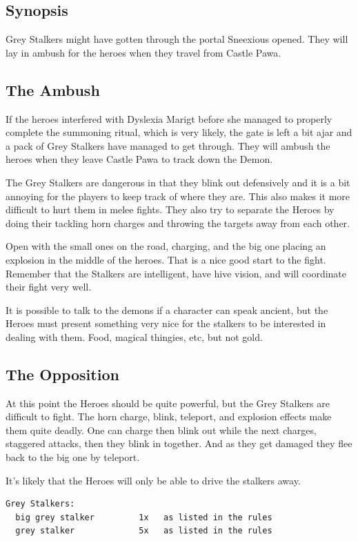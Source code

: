 \subsection*{Synopsis}
Grey Stalkers might have gotten through the portal Sneexious opened. They will lay in ambush for the heroes when they travel from Castle Pawa.


\subsection*{The Ambush}
If the heroes interfered with Dyslexia Marigt before she managed to properly complete the summoning ritual, which is very likely, the gate is left a bit ajar and a pack of Grey Stalkers have managed to get through. They will ambush the heroes when they leave Castle Pawa to track down the Demon.

The Grey Stalkers are dangerous in that they blink out defensively and it is a bit annoying for the players to keep track of where they are. This also makes it more difficult to hurt them in melee fights. They also try to separate the Heroes by doing their tackling horn charges and throwing the targets away from each other.

Open with the small ones on the road, charging, and the big one placing an explosion in the middle of the heroes. That is a nice good start to the fight. Remember that the Stalkers are intelligent, have hive vision, and will coordinate their fight very well.

It is possible to talk to the demons if a character can speak ancient, but the Heroes must present something very nice for the stalkers to be interested in dealing with them. Food, magical thingies, etc, but not gold.


\subsection*{The Opposition}
At this point the Heroes should be quite powerful, but the Grey Stalkers are difficult to fight. The horn charge, blink, teleport, and explosion effects make them quite deadly. One can charge then blink out while the next charges, staggered attacks, then they blink in together. And as they get damaged they flee back to the big one by teleport.

It's likely that the Heroes will only be able to drive the stalkers away.

\begin{samepage} \vsmall \begin{verbatim}
Grey Stalkers:
  big grey stalker         1x   as listed in the rules
  grey stalker             5x   as listed in the rules
\end{verbatim} \normalsize \end{samepage}


